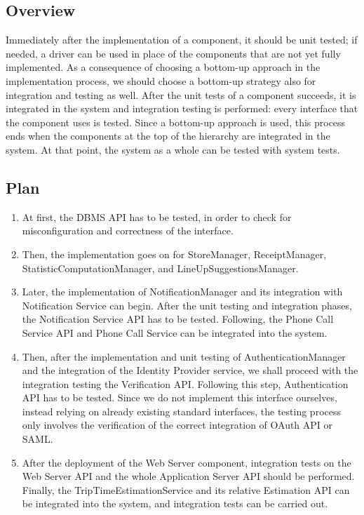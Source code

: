 \documentclass[../../main.tex]{subfiles}
\begin{document}
\subsection{Overview}

Immediately after the implementation of a component, it should be unit tested; if needed, a driver can be used in place of the components that are not yet fully implemented. 
As a consequence of choosing a bottom-up approach in the implementation process, we should choose a bottom-up strategy also for integration and testing as well. 
After the unit tests of a component succeeds, it is integrated in the system and integration testing is performed: every interface that the component uses is tested. Since a bottom-up approach is used, this process ends when the components at the top of the hierarchy are integrated in the system.
At that point, the system as a whole can be tested with system tests.

\subsection{Plan}

\begin{enumerate}

	\item At first, the DBMS API has to be tested, in order to check for misconfiguration and correctness of the interface.

	\item Then, the implementation goes on for StoreManager, ReceiptManager, StatisticComputationManager, and LineUpSuggestionsManager. 
	

	\item Later, the implementation of NotificationManager and its integration with Notification Service can begin. 
	After the unit testing and integration phases, the Notification Service API has to be tested. 
	Following, the Phone Call Service API and Phone Call Service can be integrated into the system.

	\item Then, after the implementation and unit testing of AuthenticationManager and the integration of the Identity Provider service, we shall proceed with the integration testing the Verification API. 
	Following this step, Authentication API has to be tested. Since we do not implement this interface ourselves, instead relying on already existing standard interfaces, the testing process only involves the verification of the correct integration of OAuth API or SAML.

	\item After the deployment of the Web Server component, integration tests on the Web Server API and the whole Application Server API should be performed. 
	Finally, the TripTimeEstimationService and its relative Estimation API can be integrated into the system, and integration tests can be carried out. 

\end{enumerate}
\end{document}
